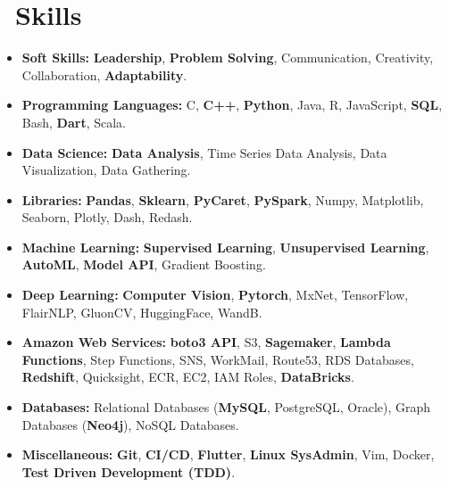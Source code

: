 \section{\texorpdfstring{\faCogs}{}\ Skills}
\begin{itemize}[parsep=0.5ex]
  \item \textbf{Soft Skills:} \textbf{Leadership}, \textbf{Problem Solving}, Communication, Creativity, Collaboration, \textbf{Adaptability}.
  \item \textbf{Programming Languages:} C, \textbf{C++}, \textbf{Python}, Java, R, JavaScript, \textbf{SQL}, Bash, \textbf{Dart}, Scala.
  \item \textbf{Data Science:} \textbf{Data Analysis}, Time Series Data Analysis, Data Visualization, Data Gathering.
  \item  \textbf{Libraries:} \textbf{Pandas}, \textbf{Sklearn}, \textbf{PyCaret}, \textbf{PySpark}, Numpy, Matplotlib, Seaborn, Plotly, Dash, Redash.
  \item \textbf{Machine Learning:} \textbf{Supervised Learning}, \textbf{Unsupervised Learning}, \textbf{AutoML}, \textbf{Model API}, Gradient Boosting.
  \item \textbf{Deep Learning:} \textbf{Computer Vision}, \textbf{Pytorch}, MxNet, TensorFlow, FlairNLP, GluonCV, HuggingFace, WandB.
  \item \textbf{Amazon Web Services:} \textbf{boto3 API}, S3, \textbf{Sagemaker}, \textbf{Lambda Functions}, Step Functions, SNS, WorkMail, Route53, RDS Databases, \textbf{Redshift}, Quicksight, ECR, EC2, IAM Roles, \textbf{DataBricks}.
  \item \textbf{Databases:} Relational Databases (\textbf{MySQL}, PostgreSQL, Oracle), Graph Databases (\textbf{Neo4j}), NoSQL Databases.
  \item \textbf{Miscellaneous:} \textbf{Git}, \textbf{CI/CD}, \textbf{Flutter}, \textbf{Linux SysAdmin}, Vim, Docker, \textbf{Test Driven Development (TDD)}.
\end{itemize}